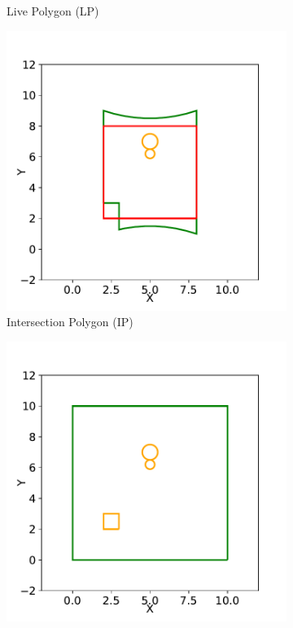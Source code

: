 \begin{figure}[ht]
\begin{subfigure}[t]{.30\linewidth}
    \caption{Live Polygon (LP)\label{fig:ch6_map_update_b}}
  \end{subfigure}
  
  \begin{subfigure}[t]{.30\linewidth}
    \centering\includegraphics[clip, trim=0cm 0cm 0.0cm 0cm, width=.99\linewidth]{chapter_6_landingsim/figs/map_update_c.pdf}
    \caption{Intersection Polygon (IP)\label{fig:ch6_map_update_c}}
  \end{subfigure}
  \begin{subfigure}[t]{.30\linewidth}
    \centering\includegraphics[clip, trim=0cm 0cm 0.0cm 0cm, width=.99\linewidth]{chapter_6_landingsim/figs/map_update_d.pdf}

\end{subfigure}
\end{figure}
